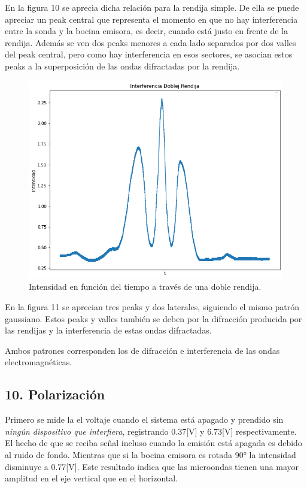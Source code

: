\documentclass[a4paper,twocolumn,10pt]{article}
\begin{document}
En la figura 10 se aprecia dicha relación para la rendija simple. De ella se puede apreciar un peak  central que representa el momento en que no hay interferencia entre la sonda y la bocina emisora, es decir, cuando está justo en frente de la rendija. Además se ven dos peaks menores a cada lado separados por dos valles del peak central, pero como hay interferencia en esos sectores, se asocian estos peaks a la superposición de las ondas difractadas por la rendija.
\begin{figure}[H]
    \centering
    \includegraphics[scale=.3]{PlotMOAnalisis/plot_doble_rendj.png}
    \caption{Intensidad en función del tiempo a través de una doble rendija.}
    \label{fig:my_label}
\end{figure}

En la figura 11 se aprecian tres peaks y dos laterales, siguiendo el mismo patrón gaussiano. Estos peaks y valles también se deben por la difracción producida por las rendijas y la interferencia de estas ondas difractadas.

Ambos patrones corresponden los de difracción e interferencia de las ondas electromagnéticas.



\subsection*{10. Polarización}
Primero se mide la el voltaje cuando el sistema está apagado y prendido sin \textit{ningún dispositivo que interfiera}, registrando 0.37[V] y 6.73[V] respectivamente. El hecho de que se reciba señal incluso cuando la emisión está apagada es debido al ruido de fondo. Mientras que si la bocina emisora es rotada 90° la intensidad disminuye a 0.77[V]. Este resultado indica que las microondas tienen una mayor amplitud en el eje vertical que en el horizontal.
\end{document}
